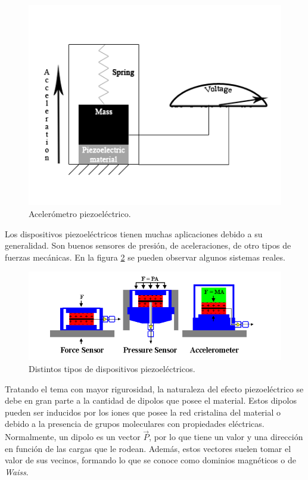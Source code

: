 \documentclass[12pt]{book}
\numberwithin{equation}{section}
\begin{document}
\begin{figure}[h]
    \centering
    \includegraphics[scale=0.8]{piezoelectric.png}
    \caption{Acelerómetro piezoeléctrico.}
    \label{fig:piezoelectric}
\end{figure}

Los dispositivos piezoeléctricos tienen muchas aplicaciones debido a su generalidad. Son buenos sensores de presión, de aceleraciones, de otro tipos de fuerzas mecánicas. En la figura \ref{fig:piezotypes} se pueden observar algunos sistemas reales.

\begin{figure}[h]
    \centering
    \includegraphics[width=1\textwidth]{piezoelectrictypes.png}
    \caption{Distintos tipos de dispositivos piezoeléctricos.}
    \label{fig:piezotypes}
\end{figure}


Tratando el tema con mayor rigurosidad, la naturaleza del efecto piezoeléctrico se debe en gran parte a la cantidad de dipolos que posee el material. Estos dipolos pueden ser inducidos por los iones que posee la red cristalina del material o debido a la presencia de grupos moleculares con propiedades eléctricas. Normalmente, un dipolo es un vector $\vec{P}$, por lo que tiene un valor y una dirección en función de las cargas que le rodean. Además, estos vectores suelen tomar el valor de sus vecinos, formando lo que se conoce como dominios magnéticos o de \textit{Waiss}. 
\end{document}
